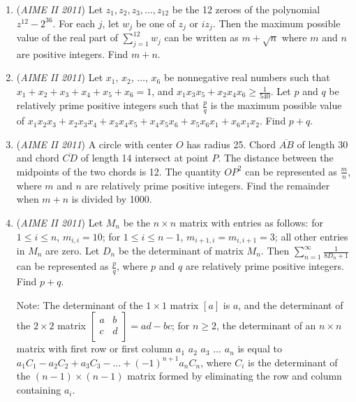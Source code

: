 \begin{enumerate}
 

	\item (\textit{AIME II 2011}) Let $z_1,z_2,z_3,\dots,z_{12}$ be the 12 zeroes of the polynomial $z^{12}-2^{36}$. For each $j$, let $w_j$ be one of $z_j$ or $i z_j$. Then the maximum possible value of the real part of $\sum_{j=1}^{12} w_j$ can be written as $m+\sqrt{n}$ where $m$ and $n$ are positive integers. Find $m+n$.


 

	\item (\textit{AIME II 2011}) Let $x_1$, $x_2$, $\dots$, $x_6$ be nonnegative real numbers such that $x_1 + x_2 + x_3 + x_4 + x_5 + x_6 = 1$, and $x_1x_3x_5 + x_2x_4x_6 \ge {\frac{1}{540}}$. Let $p$ and $q$ be relatively prime positive integers such that $\frac{p}{q}$ is the maximum possible value of $x_1x_2x_3 + x_2x_3x_4 + x_3x_4x_5 + x_4x_5x_6 + x_5x_6x_1 + x_6x_1x_2$. Find $p + q$.


 

	\item (\textit{AIME II 2011}) A circle with center $O$ has radius 25. Chord $\overline{AB}$ of length 30 and chord $\overline{CD}$ of length 14 intersect at point $P$. The distance between the midpoints of the two chords is 12. The quantity $OP^2$ can be represented as $\frac{m}{n}$, where $m$ and $n$ are relatively prime positive integers. Find the remainder when $m + n$ is divided by 1000.


 

	\item (\textit{AIME II 2011}) Let $M_n$ be the $n \times n$ matrix with entries as follows: for $1 \le i \le n$, $m_{i,i} = 10$; for $1 \le i \le n - 1$, $m_{i+1,i} = m_{i,i+1} = 3$; all other entries in $M_n$ are zero. Let $D_n$ be the determinant of matrix $M_n$. Then $\sum_{n=1}^{\infty} \frac{1}{8D_n+1}$ can be represented as $\frac{p}{q}$, where $p$ and $q$ are relatively prime positive integers. Find $p + q$. 


 Note: The determinant of the $1 \times 1$ matrix $[a]$ is $a$, and the determinant of the $2 \times 2$ matrix $\left[ {\begin{array}{cc}  a & b  \\  c & d  \\  \end{array} } \right] = ad - bc$; for $n \ge 2$, the determinant of an $n \times n$ matrix with first row or first column $a_1$ $a_2$ $a_3$ $\dots$ $a_n$ is equal to $a_1C_1 - a_2C_2 + a_3C_3 - \dots + (-1)^{n+1}a_nC_n$, where $C_i$ is the determinant of the $(n - 1) \times (n - 1)$ matrix formed by eliminating the row and column containing $a_i$.



\end{enumerate}
